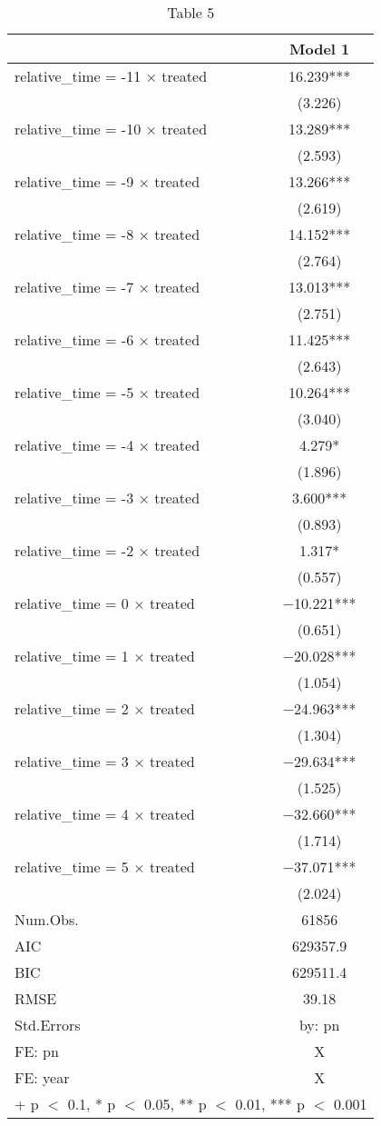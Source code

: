 \begin{table}

\caption{Table 5}
\centering
\begin{tabular}[t]{lc}
\toprule
  & Model 1\\
\midrule
relative\_time = -11 × treated & \num{16.239}***\\
 & (\num{3.226})\\
relative\_time = -10 × treated & \num{13.289}***\\
 & (\num{2.593})\\
relative\_time = -9 × treated & \num{13.266}***\\
 & (\num{2.619})\\
relative\_time = -8 × treated & \num{14.152}***\\
 & (\num{2.764})\\
relative\_time = -7 × treated & \num{13.013}***\\
 & (\num{2.751})\\
relative\_time = -6 × treated & \num{11.425}***\\
 & (\num{2.643})\\
relative\_time = -5 × treated & \num{10.264}***\\
 & (\num{3.040})\\
relative\_time = -4 × treated & \num{4.279}*\\
 & (\num{1.896})\\
relative\_time = -3 × treated & \num{3.600}***\\
 & (\num{0.893})\\
relative\_time = -2 × treated & \num{1.317}*\\
 & (\num{0.557})\\
relative\_time = 0 × treated & \num{-10.221}***\\
 & (\num{0.651})\\
relative\_time = 1 × treated & \num{-20.028}***\\
 & (\num{1.054})\\
relative\_time = 2 × treated & \num{-24.963}***\\
 & (\num{1.304})\\
relative\_time = 3 × treated & \num{-29.634}***\\
 & (\num{1.525})\\
relative\_time = 4 × treated & \num{-32.660}***\\
 & (\num{1.714})\\
relative\_time = 5 × treated & \num{-37.071}***\\
 & (\num{2.024})\\
\midrule
Num.Obs. & \num{61856}\\
AIC & \num{629357.9}\\
BIC & \num{629511.4}\\
RMSE & \num{39.18}\\
Std.Errors & by: pn\\
FE: pn & X\\
FE: year & X\\
\bottomrule
\multicolumn{2}{l}{\rule{0pt}{1em}+ p $<$ 0.1, * p $<$ 0.05, ** p $<$ 0.01, *** p $<$ 0.001}\\
\end{tabular}
\end{table}
